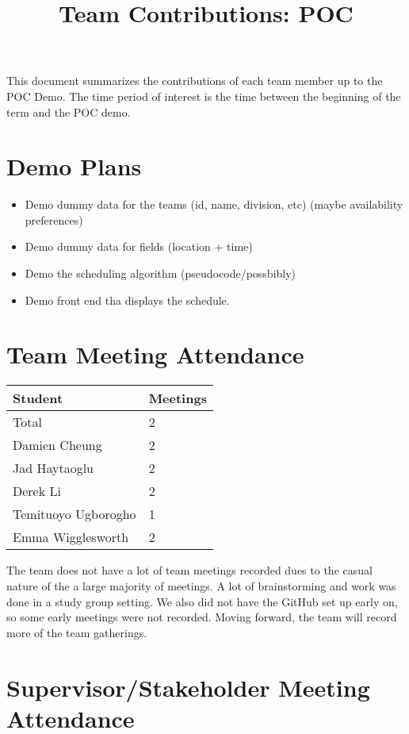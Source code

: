 \documentclass{article}
\title{Team Contributions: POC\\\progname}
\author{\authname}
\date{}
\begin{document}
\maketitle

This document summarizes the contributions of each team member up to the POC
Demo.  The time period of interest is the time between the beginning of the term
and the POC demo.

\section{Demo Plans}

\begin{itemize}
	\item Demo dummy data for the teams (id, name, division, etc) (maybe availability preferences)
	\item Demo dummy data for fields (location + time)
	\item Demo the scheduling algorithm (pseudocode/possbibly)
	\item Demo front end tha displays the schedule.
\end{itemize}

\section{Team Meeting Attendance}

\begin{table}[H]
\centering
\begin{tabular}{ll}
\toprule
\textbf{Student} & \textbf{Meetings}\\
\midrule
Total & 2\\
Damien Cheung & 2\\
Jad Haytaoglu & 2\\
Derek Li & 2\\
Temituoyo Ugborogho & 1\\
Emma Wigglesworth & 2\\
\bottomrule
\end{tabular}
\end{table}

The team does not have a lot of team meetings recorded dues to the casual nature
of the a large majority of meetings. A lot of brainstorming and work was done 
in a study group setting. We also did not have the GitHub set up early on, so some
early meetings were not recorded. Moving forward, the team will record more of the
team gatherings.

\section{Supervisor/Stakeholder Meeting Attendance}
\end{document}
